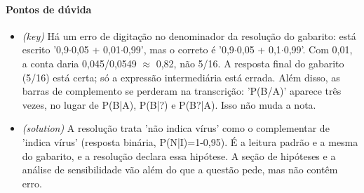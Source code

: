 \documentclass{article}%
\begin{document}
\paragraph{Pontos de dúvida}%
\begin{itemize}%
\item%
\textit{(key)} Há um erro de digitação no denominador da resolução do gabarito: está escrito '0,9$\cdot$0,05 + 0,01$\cdot$0,99', mas o correto é '0,9$\cdot$0,05 + 0,1$\cdot$0,99'. Com 0,01, a conta daria 0,045/0,0549 $\approx$ 0,82, não 5/16. A resposta final do gabarito (5/16) está certa; só a expressão intermediária está errada. Além disso, as barras de complemento se perderam na transcrição: 'P(B/A)' aparece três vezes, no lugar de P(B|A), P(B|?) e P(B?|A). Isso não muda a nota.%
\item%
\textit{(solution)} A resolução trata 'não indica vírus' como o complementar de 'indica vírus' (resposta binária, P(N|I)=1-0,95). É a leitura padrão e a mesma do gabarito, e a resolução declara essa hipótese. A seção de hipóteses e a análise de sensibilidade vão além do que a questão pede, mas não contêm erro.%
\end{itemize}%
\end{document}
